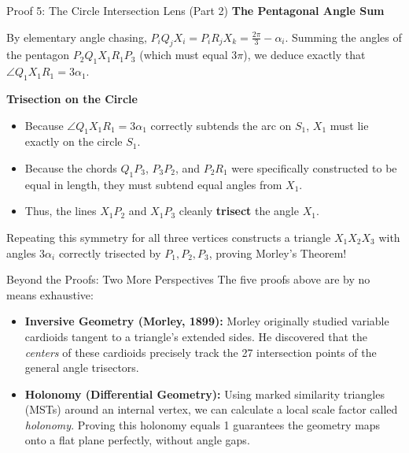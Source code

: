 \documentclass[aspectratio=169,10pt]{beamer}
\begin{document}
\begin{frame}{Proof 5: The Circle Intersection Lens (Part 2)}
\small
\textbf{The Pentagonal Angle Sum}
\vspace{0.1cm}

By elementary angle chasing, $P_i Q_j X_i = P_i R_j X_k = \frac{2\pi}{3} - \alpha_i$.
Summing the angles of the pentagon $P_2 Q_1 X_1 R_1 P_3$ (which must equal $3\pi$), we deduce exactly that $\angle Q_1 X_1 R_1 = 3\alpha_1$.

\vspace{0.2cm}
\textbf{Trisection on the Circle}
\vspace{0.1cm}

\begin{itemize}\footnotesize
  \item Because $\angle Q_1 X_1 R_1 = 3\alpha_1$ correctly subtends the arc on $S_1$, $X_1$ must lie exactly on the circle $S_1$.
  \item Because the chords $Q_1 P_3$, $P_3 P_2$, and $P_2 R_1$ were specifically constructed to be equal in length, they must subtend equal angles from $X_1$.
  \item Thus, the lines $X_1 P_2$ and $X_1 P_3$ cleanly \textbf{trisect} the angle $X_1$.
\end{itemize}

Repeating this symmetry for all three vertices constructs a triangle $X_1 X_2 X_3$ with angles $3\alpha_i$ correctly trisected by $P_1, P_2, P_3$, proving Morley's Theorem!
\end{frame}

\begin{frame}{Beyond the Proofs: Two More Perspectives}
\small
The five proofs above are by no means exhaustive:
\vspace{0.2cm}
\begin{itemize}
    \item \textbf{Inversive Geometry (Morley, 1899):} Morley originally studied variable cardioids tangent to a triangle's extended sides. He discovered that the \textit{centers} of these cardioids precisely track the 27 intersection points of the general angle trisectors.
    
    \vspace{0.15cm}
    
    \item \textbf{Holonomy (Differential Geometry):} Using marked similarity triangles (MSTs) around an internal vertex, we can calculate a local scale factor called \textit{holonomy}. Proving this holonomy equals 1 guarantees the geometry maps onto a flat plane perfectly, without angle gaps.
\end{itemize}
\end{frame}
\end{document}
